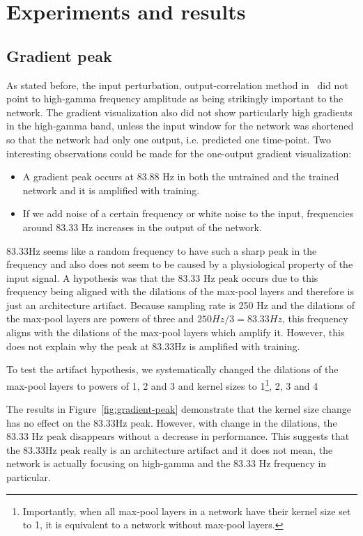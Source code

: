 \chapter{Experiments and results}
\label{ch:exp}

\section{Gradient peak}\label{sec:gradient-peak}
As stated before, the input perturbation, output-correlation method in~\cite{Hammer-2021} did not point to high-gamma frequency amplitude as being strikingly important to the network. The gradient visualization also did not show particularly high gradients in the high-gamma band, unless the input window for the network was shortened so that the network had only one output, i.e. predicted one time-point. Two interesting observations could be made for the one-output gradient visualization:
\begin{itemize}
\item[1.] A gradient peak occurs at 83.88 Hz in both the untrained and the trained network and it is amplified with training.
\item[2.] If we add noise of a certain frequency or white noise to the input, frequencies around 83.33 Hz increases in the output of the network.
\end{itemize}

83.33Hz seems like a random frequency to have such a sharp peak in the frequency and also does not seem to be caused by a physiological property of the input signal.
A hypothesis was that the 83.33 Hz peak occurs due to this frequency being aligned with the dilations of the max-pool layers and therefore is just an architecture artifact.
Because sampling rate is 250 Hz and the dilations of the max-pool layers are powers of three and $250Hz/3 = 83.33Hz$, this frequency aligns with the dilations of the max-pool layers which amplify it.
However, this does not explain why the peak at 83.33Hz is amplified with training.

To test the artifact hypothesis, we systematically changed the dilations of the max-pool layers to powers of 1, 2 and 3 and kernel sizes to 1\footnote{Importantly, when all max-pool layers in a network have their kernel size set to 1, it is equivalent to a network without max-pool layers.}, 2, 3 and 4

The results in Figure~\ref{fig:gradient-peak} demonstrate that the kernel size change has no effect on the 83.33Hz peak.
However, with change in the dilations, the 83.33 Hz peak disappears without a decrease in performance.
This suggests that the 83.33Hz peak really is an architecture artifact and it does not mean, the network is actually focusing on high-gamma and the 83.33 Hz frequency in particular.

